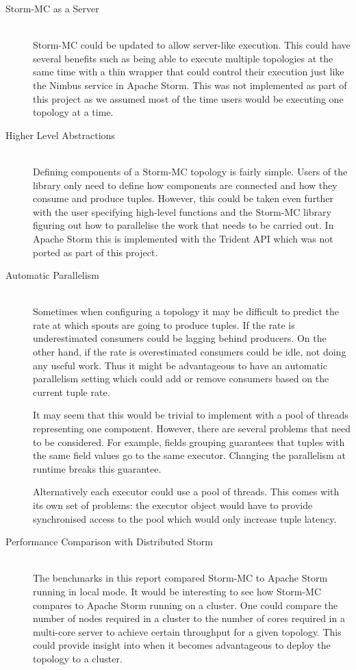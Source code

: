 \documentclass[bsc,twoside,singlespacing,normalheadings,parskip]{infthesis}\usepackage[]{graphicx}\usepackage[]{color}
\begin{document}
\begin{description}
	\item[Storm-MC as a Server] \hfill \\
	Storm-MC could be updated to allow server-like execution. This could have several benefits such as being able to execute multiple topologies at the same time with a thin wrapper that could control their execution just like the Nimbus service in Apache Storm. This was not implemented as part of this project as we assumed most of the time users would be executing one topology at a time.
	\item[Higher Level Abstractions] \hfill \\
	Defining components of a Storm-MC topology is fairly simple. Users of the library only need to define how components are connected and how they consume and produce tuples. However, this could be taken even further with the user specifying high-level functions and the Storm-MC library figuring out how to parallelise the work that needs to be carried out. In Apache Storm this is implemented with the Trident API which was not ported as part of this project.
	\item[Automatic Parallelism] \hfill \\
	Sometimes when configuring a topology it may be difficult to predict the rate at which spouts are going to produce tuples. If the rate is underestimated consumers could be lagging behind producers. On the other hand, if the rate is overestimated consumers could be idle, not doing any useful work. Thus it might be advantageous to have an automatic parallelism setting which could add or remove consumers based on the current tuple rate.
	
	It may seem that this would be trivial to implement with a pool of threads representing one component. However, there are several problems that need to be considered. For example, fields grouping guarantees that tuples with the same field values go to the same executor. Changing the parallelism at runtime breaks this guarantee.
	
	Alternatively each executor could use a pool of threads. This comes with its own set of problems: the executor object would have to provide synchronised access to the pool which would only increase tuple latency.
	\item[Performance Comparison with Distributed Storm] \hfill \\
	The benchmarks in this report compared Storm-MC to Apache Storm running in local mode. It would be interesting to see how Storm-MC compares to Apache Storm running on a cluster. One could compare the number of nodes required in a cluster to the number of cores required in a multi-core server to achieve certain throughput for a given topology. This could provide insight into when it becomes advantageous to deploy the topology to a cluster.
\end{description}
\end{document}
